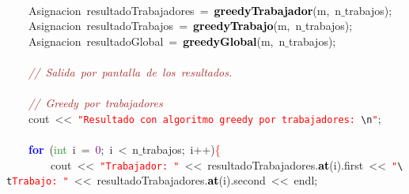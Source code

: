 \mbox{}\ \ \ \  \\
\mbox{}\ \ \ \  \\
\mbox{} \\
\mbox{}\ \ \ \ \textcolor{TealBlue}{Asignacion}\ resultadoTrabajadores\ \textcolor{BrickRed}{=}\ \textbf{\textcolor{Black}{greedyTrabajador}}\textcolor{BrickRed}{(}m\textcolor{BrickRed}{,}\ n$\_$trabajos\textcolor{BrickRed}{);}\  \\
\mbox{}\ \ \ \ \textcolor{TealBlue}{Asignacion}\ resultadoTrabajos\ \textcolor{BrickRed}{=}\ \textbf{\textcolor{Black}{greedyTrabajo}}\textcolor{BrickRed}{(}m\textcolor{BrickRed}{,}\ n$\_$trabajos\textcolor{BrickRed}{);}\  \\
\mbox{}\ \ \ \ \textcolor{TealBlue}{Asignacion}\ resultadoGlobal\ \textcolor{BrickRed}{=}\ \textbf{\textcolor{Black}{greedyGlobal}}\textcolor{BrickRed}{(}m\textcolor{BrickRed}{,}\ n$\_$trabajos\textcolor{BrickRed}{);}\  \\
\mbox{} \\
\mbox{}\ \ \ \ \textit{\textcolor{Brown}{//\ Salida\ por\ pantalla\ de\ los\ resultados.\ }} \\
\mbox{} \\
\mbox{}\ \ \ \ \textit{\textcolor{Brown}{//\ Greedy\ por\ trabajadores}} \\
\mbox{}\ \ \ \ cout\ \textcolor{BrickRed}{\textless{}\textless{}}\ \texttt{\textcolor{Red}{"{}Resultado\ con\ algoritmo\ greedy\ por\ trabajadores:\ }}\texttt{\textcolor{CarnationPink}{\textbackslash{}n}}\texttt{\textcolor{Red}{"{}}}\textcolor{BrickRed}{;}\  \\
\mbox{}\ \ \ \  \\
\mbox{}\ \ \ \ \textbf{\textcolor{Blue}{for}}\ \textcolor{BrickRed}{(}\textcolor{ForestGreen}{int}\ i\ \textcolor{BrickRed}{=}\ \textcolor{Purple}{0}\textcolor{BrickRed}{;}\ i\ \textcolor{BrickRed}{\textless{}}\ n$\_$trabajos\textcolor{BrickRed}{;}\ i\textcolor{BrickRed}{++)}\textcolor{Red}{\{} \\
\mbox{}\ \ \ \ \ \ \ \ cout\ \textcolor{BrickRed}{\textless{}\textless{}}\ \texttt{\textcolor{Red}{"{}Trabajador:\ "{}}}\ \textcolor{BrickRed}{\textless{}\textless{}}\ resultadoTrabajadores\textcolor{BrickRed}{.}\textbf{\textcolor{Black}{at}}\textcolor{BrickRed}{(}i\textcolor{BrickRed}{).}first\ \textcolor{BrickRed}{\textless{}\textless{}}\ \texttt{\textcolor{Red}{"{}}}\texttt{\textcolor{CarnationPink}{\textbackslash{}t}}\texttt{\textcolor{Red}{Trabajo:\ "{}}}\ \textcolor{BrickRed}{\textless{}\textless{}}\ resultadoTrabajadores\textcolor{BrickRed}{.}\textbf{\textcolor{Black}{at}}\textcolor{BrickRed}{(}i\textcolor{BrickRed}{).}second\ \textcolor{BrickRed}{\textless{}\textless{}}\ endl\textcolor{BrickRed}{;}\  \\
